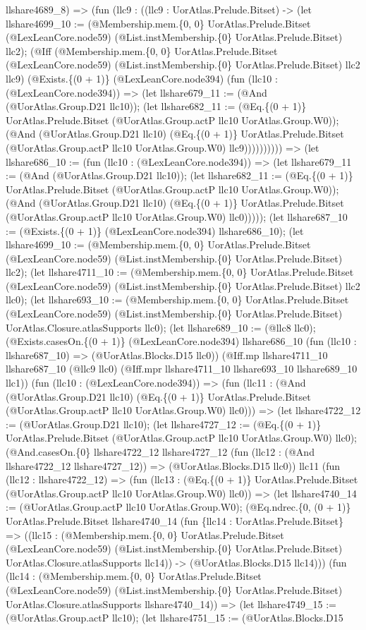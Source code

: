 \documentclass[11pt]{article}
\begin{document}
llshare4689\_8) => (fun (llc9 : ((llc9 : UorAtlas.Prelude.Bitset) -> (let llshare4699\_10 := (@Membership.mem.\{0, 0\} UorAtlas.Prelude.Bitset (@LexLeanCore.node59) (@List.instMembership.\{0\} UorAtlas.Prelude.Bitset) llc2); (@Iff (@Membership.mem.\{0, 0\} UorAtlas.Prelude.Bitset (@LexLeanCore.node59) (@List.instMembership.\{0\} UorAtlas.Prelude.Bitset) llc2 llc9) (@Exists.\{(0 + 1)\} (@LexLeanCore.node394) (fun (llc10 : (@LexLeanCore.node394)) => (let llshare679\_11 := (@And (@UorAtlas.Group.D21 llc10)); (let llshare682\_11 := (@Eq.\{(0 + 1)\} UorAtlas.Prelude.Bitset (@UorAtlas.Group.actP llc10 UorAtlas.Group.W0)); (@And (@UorAtlas.Group.D21 llc10) (@Eq.\{(0 + 1)\} UorAtlas.Prelude.Bitset (@UorAtlas.Group.actP llc10 UorAtlas.Group.W0) llc9)))))))))) => (let llshare686\_10 := (fun (llc10 : (@LexLeanCore.node394)) => (let llshare679\_11 := (@And (@UorAtlas.Group.D21 llc10)); (let llshare682\_11 := (@Eq.\{(0 + 1)\} UorAtlas.Prelude.Bitset (@UorAtlas.Group.actP llc10 UorAtlas.Group.W0)); (@And (@UorAtlas.Group.D21 llc10) (@Eq.\{(0 + 1)\} UorAtlas.Prelude.Bitset (@UorAtlas.Group.actP llc10 UorAtlas.Group.W0) llc0))))); (let llshare687\_10 := (@Exists.\{(0 + 1)\} (@LexLeanCore.node394) llshare686\_10); (let llshare4699\_10 := (@Membership.mem.\{0, 0\} UorAtlas.Prelude.Bitset (@LexLeanCore.node59) (@List.instMembership.\{0\} UorAtlas.Prelude.Bitset) llc2); (let llshare4711\_10 := (@Membership.mem.\{0, 0\} UorAtlas.Prelude.Bitset (@LexLeanCore.node59) (@List.instMembership.\{0\} UorAtlas.Prelude.Bitset) llc2 llc0); (let llshare693\_10 := (@Membership.mem.\{0, 0\} UorAtlas.Prelude.Bitset (@LexLeanCore.node59) (@List.instMembership.\{0\} UorAtlas.Prelude.Bitset) UorAtlas.Closure.atlasSupports llc0); (let llshare689\_10 := (@llc8 llc0); (@Exists.casesOn.\{(0 + 1)\} (@LexLeanCore.node394) llshare686\_10 (fun (llc10 : llshare687\_10) => (@UorAtlas.Blocks.D15 llc0)) (@Iff.mp llshare4711\_10 llshare687\_10 (@llc9 llc0) (@Iff.mpr llshare4711\_10 llshare693\_10 llshare689\_10 llc1)) (fun (llc10 : (@LexLeanCore.node394)) => (fun (llc11 : (@And (@UorAtlas.Group.D21 llc10) (@Eq.\{(0 + 1)\} UorAtlas.Prelude.Bitset (@UorAtlas.Group.actP llc10 UorAtlas.Group.W0) llc0))) => (let llshare4722\_12 := (@UorAtlas.Group.D21 llc10); (let llshare4727\_12 := (@Eq.\{(0 + 1)\} UorAtlas.Prelude.Bitset (@UorAtlas.Group.actP llc10 UorAtlas.Group.W0) llc0); (@And.casesOn.\{0\} llshare4722\_12 llshare4727\_12 (fun (llc12 : (@And llshare4722\_12 llshare4727\_12)) => (@UorAtlas.Blocks.D15 llc0)) llc11 (fun (llc12 : llshare4722\_12) => (fun (llc13 : (@Eq.\{(0 + 1)\} UorAtlas.Prelude.Bitset (@UorAtlas.Group.actP llc10 UorAtlas.Group.W0) llc0)) => (let llshare4740\_14 := (@UorAtlas.Group.actP llc10 UorAtlas.Group.W0); (@Eq.ndrec.\{0, (0 + 1)\} UorAtlas.Prelude.Bitset llshare4740\_14 (fun \{llc14 : UorAtlas.Prelude.Bitset\} => ((llc15 : (@Membership.mem.\{0, 0\} UorAtlas.Prelude.Bitset (@LexLeanCore.node59) (@List.instMembership.\{0\} UorAtlas.Prelude.Bitset) UorAtlas.Closure.atlasSupports llc14)) -> (@UorAtlas.Blocks.D15 llc14))) (fun (llc14 : (@Membership.mem.\{0, 0\} UorAtlas.Prelude.Bitset (@LexLeanCore.node59) (@List.instMembership.\{0\} UorAtlas.Prelude.Bitset) UorAtlas.Closure.atlasSupports llshare4740\_14)) => (let llshare4749\_15 := (@UorAtlas.Group.actP llc10); (let llshare4751\_15 := (@UorAtlas.Blocks.D15 
\end{document}
